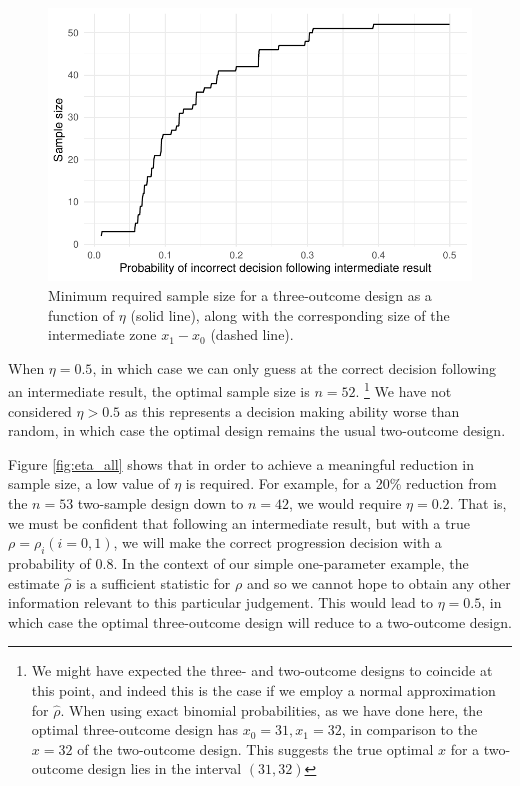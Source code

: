 \documentclass[sagev]{sagej}
\begin{document}
\begin{figure}
\centering
\includegraphics[scale=0.8]{./figures/eta_ns}
\caption{Minimum required sample size for a three-outcome design as a function of $\eta$ (solid line), along with the corresponding size of the intermediate zone $x_1 - x_0$ (dashed line).}
\label{fig:eta_ns}
\end{figure}

When $\eta = 0.5$, in which case we can only guess at the correct decision following an intermediate result, the optimal sample size is $n = 52$. \footnote{We might have expected the three- and two-outcome designs to coincide at this point, and indeed this is the case if we employ a normal approximation for $\hat{\rho}$. When using exact binomial probabilities, as we have done here, the optimal three-outcome design has $x_0 = 31, x_1 = 32$, in comparison to the $x = 32$ of the two-outcome design. This suggests the true optimal $x$ for a two-outcome design lies in the interval $(31, 32)$} We have not considered $\eta > 0.5$ as this represents a decision making ability worse than random, in which case the optimal design remains the usual two-outcome design.

Figure \ref{fig:eta_all} shows that in order to achieve a meaningful reduction in sample size, a low value of $\eta$ is required. For example, for a 20\% reduction from the $n = 53$ two-sample design down to $n = 42$, we would require $\eta = 0.2$. That is, we must be confident that following an intermediate result, but with a true $\rho = \rho_i (i = 0,1)$, we will make the correct progression decision with a probability of 0.8. In the context of our simple one-parameter example, the estimate $\hat{\rho}$ is a sufficient statistic for $\rho$ and so we cannot hope to obtain any other information relevant to this particular judgement. This would lead to $\eta = 0.5$, in which case the optimal three-outcome design will reduce to a two-outcome design.
\end{document}
